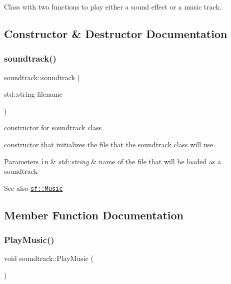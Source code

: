 Class with two functions to play either a sound effect or a music track. 

\subsection{Constructor \& Destructor Documentation}
\mbox{\label{classsoundtrack_add31bdeb1a693d541443f1d88586d3b6}} 
\subsubsection{\texorpdfstring{soundtrack()}{soundtrack()}}
{\footnotesize\ttfamily soundtrack\+::soundtrack (\begin{DoxyParamCaption}\item[{std\+::string}]{filename }\end{DoxyParamCaption})}



constructor for soundtrack class 

constructor that initializes the file that the soundtrack class will use.


\begin{DoxyParams}[1]{Parameters}
\mbox{\tt in}  & {\em std\+::string} & name of the file that will be loaded as a soundtrack\\
\hline
\end{DoxyParams}
\begin{DoxySeeAlso}{See also}
\href{http://www.sfml-dev.org/documentation/2.0/classsf_1_1Music.php}{\tt sf\+::\+Music} 
\end{DoxySeeAlso}


\subsection{Member Function Documentation}
\mbox{\label{classsoundtrack_a9bc49316f0c8607aef388728d2ca28db}} 
\subsubsection{\texorpdfstring{Play\+Music()}{PlayMusic()}}
{\footnotesize\ttfamily void soundtrack\+::\+Play\+Music (\begin{DoxyParamCaption}{ }\end{DoxyParamCaption})}




